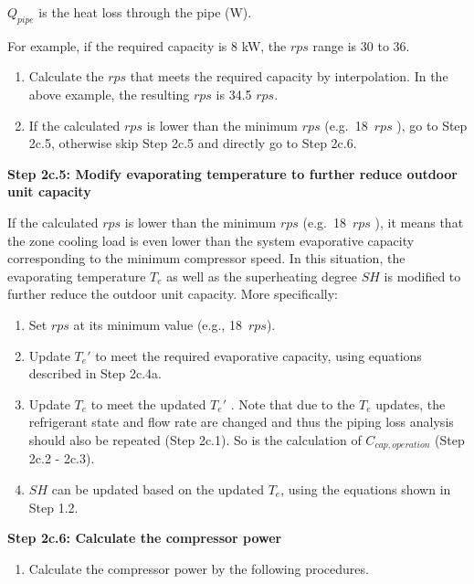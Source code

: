 \(Q_{pipe}\) is the heat loss through the pipe (W).

For example, if the required capacity is 8 kW, the \(rps\) range is 30 to 36.

\begin{enumerate}
\def\labelenumi{\alph{enumi}.}
\setcounter{enumi}{2}
\item
  Calculate the \(rps\) that meets the required capacity by interpolation. In the above example, the resulting \(rps\) is 34.5 \(rps\).
\item
  If the calculated \(rps\) is lower than the minimum \(rps\) (e.g.~18~\(rps\) ), go to Step 2c.5, otherwise skip Step 2c.5 and directly go to Step 2c.6.
\end{enumerate}

\textbf{Step 2c.5: Modify evaporating temperature to further reduce outdoor unit capacity} 

If the calculated \(rps\) is lower than the minimum \(rps\) (e.g.~18~\(rps\) ), it means that the zone cooling load is even lower than the system evaporative capacity corresponding to the minimum compressor speed. In this situation, the evaporating temperature \(T_e\) as well as the superheating degree \(SH\) is modified to further reduce the outdoor unit capacity. More specifically:

\begin{enumerate}
\def\labelenumi{\alph{enumi}.}
\item
  Set \(rps\) at its minimum value (e.g., 18~\(rps\)).
\item
  Update \({T_e}'\) to meet the required evaporative capacity, using equations described in Step 2c.4a.
\item
  Update \(T_e\) to meet the updated \({T_e}'\) . Note that due to the \(T_e\) updates, the refrigerant state and flow rate are changed and thus the piping loss analysis should also be repeated (Step 2c.1). So is the calculation of \(C_{cap,operation}\) (Step 2c.2 - 2c.3).
\item
  \(SH\) can be updated based on the updated \(T_e\), using the equations shown in Step 1.2.
\end{enumerate}

\textbf{Step 2c.6: Calculate the compressor power} 

\begin{enumerate}
\def\labelenumi{(\arabic{enumi})}
\tightlist
\item
  Calculate the compressor power by the following procedures. 
\end{enumerate}


